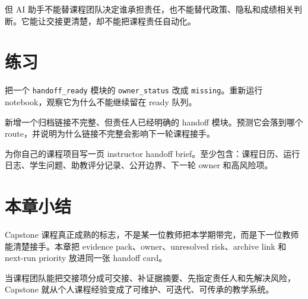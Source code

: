 但 AI 助手不能替课程团队决定谁承担责任，也不能替代政策、隐私和成绩相关判断。它能让交接更清楚，却不能把课程责任自动化。

\section{练习}

\begin{exercisebox}[基础练习]
把一个 \texttt{handoff\_ready} 模块的 \texttt{owner\_status} 改成 \texttt{missing}。重新运行 notebook，观察它为什么不能继续留在 ready 队列。
\end{exercisebox}

\begin{exercisebox}[进阶练习]
新增一个归档链接不完整、但责任人已经明确的 handoff 模块。预测它会落到哪个 route，并说明为什么链接不完整会影响下一轮课程接手。
\end{exercisebox}

\begin{exercisebox}[开放练习]
为你自己的课程项目写一页 instructor handoff brief。至少包含：课程日历、运行日志、学生问题、助教评分记录、公开边界、下一轮 owner 和高风险项。
\end{exercisebox}

\section{本章小结}

Capstone 课程真正成熟的标志，不是某一位教师把本学期带完，而是下一位教师能清楚接手。本章把 evidence pack、owner、unresolved risk、archive link 和 next-run priority 放进同一张 handoff card。

当课程团队能把交接项分成可交接、补证据摘要、先指定责任人和先解决风险，Capstone 就从个人课程经验变成了可维护、可迭代、可传承的教学系统。
